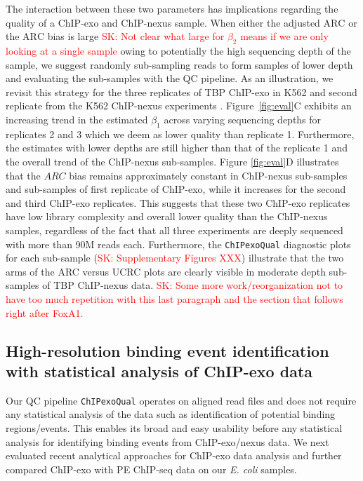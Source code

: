 \documentclass{bmcart}
\newcommand{\pname}[1]{\texttt{ChIPexoQual}}
\newcommand{\SK}[1]{\textcolor{red}{SK: #1}}
\begin{document}
The interaction between these two parameters  has implications regarding the quality of 
a ChIP-exo and ChIP-nexus sample. When either the adjusted
$\mbox{ARC}$ or the $\mbox{ARC}$ bias is large \SK{Not clear what large for $\beta_2$ means if we are only looking at a single sample} owing to potentially the high sequencing depth of the sample, we suggest
randomly sub-sampling reads to form samples of lower depth and evaluating the 
sub-samples with the QC pipeline. 
As an illustration, we revisit this strategy for  the three replicates of TBP ChIP-exo in K562 \cite{venters13} and 
second replicate from the K562  ChIP-nexus experiments \cite{chipnexus}.
Figure~\ref{fig:eval}C exhibits an increasing trend in the
estimated $\beta_1$ across varying sequencing depths for replicates 2 and 3 which we deem as lower quality than replicate 1. Furthermore, the estimates with lower depths are still higher than that of the replicate 1 and the overall trend of the ChIP-nexus sub-samples. 
Figure \ref{fig:eval}D illustrates that the $ARC$ bias remains approximately
constant in ChIP-nexus sub-samples and sub-samples of first replicate of ChIP-exo, while it increases for the second and third
ChIP-exo replicates. This suggests that these two ChIP-exo replicates have
low library complexity and overall lower quality than the ChIP-nexus
samples, regardless of the fact that all three experiments are
deeply sequenced with more than 90M  reads each. Furthermore, the \pname{}  diagnostic plots for each sub-sample (\SK{Supplementary Figures XXX}) illustrate that the two arms of the ARC versus UCRC plots are clearly visible in moderate depth sub-samples of TBP ChIP-nexus data.  \SK{Some more work/reorganization not to have too much repetition with this last paragraph and the section that follows right after FoxA1.}

\subsection*{High-resolution binding event identification with statistical analysis  of
  ChIP-exo data}

Our QC pipeline \pname{} operates on aligned read files and does not require any statistical analysis of the data such as identification of potential binding regions/events. This enables its broad and easy usability before any statistical analysis  for identifying binding events from ChIP-exo/nexus data.  We next evaluated recent analytical approaches for ChIP-exo data analysis and further compared ChIP-exo with PE ChIP-seq data on our \textit{E. coli} samples.
\end{document}
